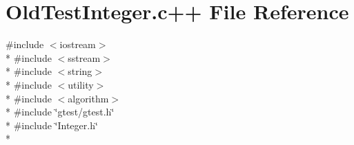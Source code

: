 \hypertarget{_old_test_integer_8c_09_09}{\section{Old\-Test\-Integer.\-c++ File Reference}
\label{_old_test_integer_8c_09_09}
}
{\ttfamily \#include $<$iostream$>$}\\*
{\ttfamily \#include $<$sstream$>$}\\*
{\ttfamily \#include $<$string$>$}\\*
{\ttfamily \#include $<$utility$>$}\\*
{\ttfamily \#include $<$algorithm$>$}\\*
{\ttfamily \#include \char`\"{}gtest/gtest.\-h\char`\"{}}\\*
{\ttfamily \#include \char`\"{}Integer.\-h\char`\"{}}\\*
